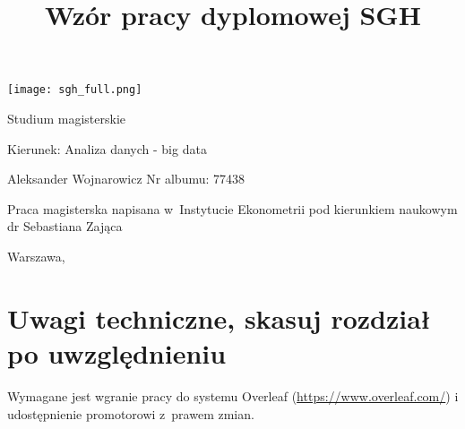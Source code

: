 \documentclass[12pt,a4paper,twoside,openany]{book}
\begin{document}
\begin{center}
\texttt{[image: sgh\_full.png]}

\vspace{1cm}

Studium magisterskie
\end{center}

\vspace{1cm}

\noindent Kierunek: Analiza danych - big data

\vspace{1cm}

{
\leftskip=10cm\noindent
Aleksander Wojnarowicz\newline
Nr albumu: 77438

}

\vspace{2cm}

\title{Wzór pracy dyplomowej SGH}
\makeatletter

\begin{center}
\LARGE\bf
\fbox{\@title}
\end{center}

\vspace{2cm}

{
\leftskip=10cm\noindent
Praca magisterska
napisana w~Instytucie Ekonometrii\newline
pod kierunkiem naukowym\newline
dr Sebastiana Zająca

}

\vfill

\begin{center}
Warszawa, \the\year
\end{center}
\thispagestyle{empty}

\clearpage
\thispagestyle{empty}
\mbox{}
\clearpage

\tableofcontents

\clearpage

\chapter*{Uwagi techniczne, skasuj rozdział po uwzględnieniu}

Wymagane jest wgranie pracy do systemu Overleaf (\url{https://www.overleaf.com/}) i udostępnienie promotorowi z~prawem zmian.
\end{document}
